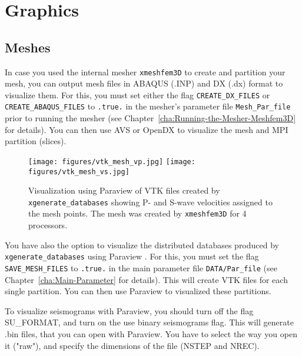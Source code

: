 \chapter{Graphics}

\section{Meshes}\label{sec:Mesh-graphics}

In case you used the internal mesher \texttt{xmeshfem3D} to create
and partition your mesh, you can output mesh files in ABAQUS (.INP)
and DX (.dx) format to visualize them. For this, you must set either
the flag \texttt{CREATE\_DX\_FILES} or \texttt{CREATE\_ABAQUS\_FILES}
to \texttt{.true.} in the mesher's parameter file \texttt{Mesh\_Par\_file}
prior to running the mesher (see Chapter~\ref{cha:Running-the-Mesher-Meshfem3D}
for details). You can then use AVS 
or OpenDX  to visualize the mesh
and MPI partition (slices).

\begin{figure}[htbp]
\noindent \begin{centering}
\texttt{[image: figures/vtk\_mesh\_vp.jpg]}
\texttt{[image: figures/vtk\_mesh\_vs.jpg]}
\par\end{centering}

\caption{Visualization using Paraview of VTK files created by \texttt{xgenerate\_databases}
showing P- and S-wave velocities assigned to the mesh points. The
mesh was created by \texttt{xmeshfem3D} for 4 processors.}


\label{fig:vtk.mesh}
\end{figure}


You have also the option to visualize the distributed databases produced
by \texttt{xgenerate\_databases} using Paraview .
For this, you must set the flag \texttt{SAVE\_MESH\_FILES} to \texttt{.true.}
in the main parameter file \texttt{DATA/Par\_file} (see Chapter~\ref{cha:Main-Parameter}
for details). This will create VTK files for each single partition.
You can then use Paraview 
to visualized these partitions.\newline

{\red To visualize seismograms with Paraview, you should turn off the flag SU\_FORMAT, and turn on the use binary seismograms flag. This will generate .bin files, that you can open with Paraview. You have to select the way you open it ("raw"), and specify the dimensions of the file (NSTEP and NREC).}

